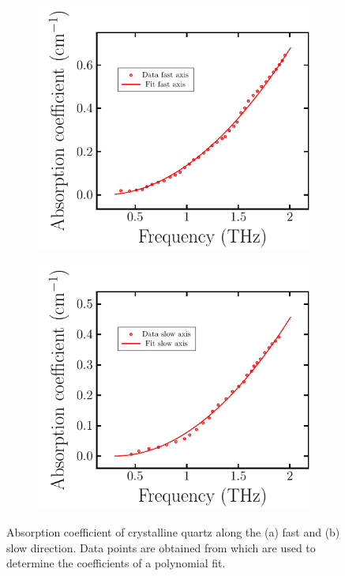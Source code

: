 \begin{figure}[H]
    \begin{subfigure}[b]{.5\linewidth}
    \caption{}\label{}
    \centering\includegraphics[scale=0.7]{images/appendix/plots/quartz_fits/abs_quartz_a.pdf}
    \end{subfigure}%
    \begin{subfigure}[b]{.5\linewidth}
    \caption{}\label{}
    \centering\includegraphics[scale=0.7]{images/appendix/plots/quartz_fits/abs_quartz_b.pdf}
    \end{subfigure}
    \caption{Absorption coefficient of crystalline quartz along the (a) fast and (b) slow direction. Data points are obtained from \cite{DGrischkowsky1990} which are used to determine the coefficients of a polynomial fit.}
    \label{fig:abs_quartz}
\end{figure}

